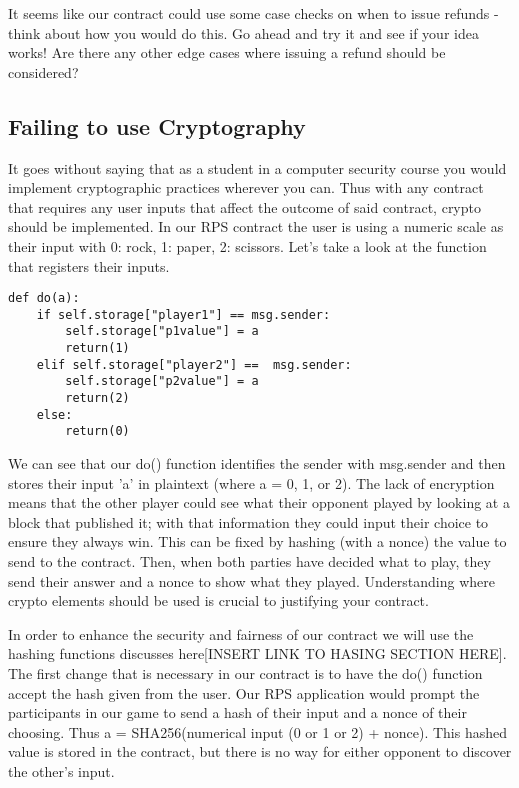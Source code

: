 \documentclass[12pt]{article}
\begin{document}
It seems like our contract could use some case checks on when to issue refunds - think about how you would do this. Go ahead and try it and see if your idea works! Are there any other edge cases where issuing a refund should be considered? 

\subsection{Failing to use Cryptography}
It goes without saying that as a student in a computer security course you would implement cryptographic practices wherever you can. Thus with any contract that requires any user inputs that affect the outcome of said contract, crypto should be implemented. In our RPS contract the user is using a numeric scale as their input with 0: rock, 1: paper, 2: scissors. Let's take a look at the function that registers their inputs.

\begin{lstlisting}[frame=single]
def do(a):
	if self.storage["player1"] == msg.sender:
		self.storage["p1value"] = a
		return(1)
	elif self.storage["player2"] ==  msg.sender:
		self.storage["p2value"] = a
		return(2)
	else:
		return(0)
\end{lstlisting}

We can see that our do() function identifies the sender with msg.sender and then stores their input 'a' in plaintext (where a = 0, 1, or 2). The lack of encryption means that the other player could see what their opponent played by looking at a block that published it; with that information they could input their choice to ensure they always win. This can be fixed by hashing (with a nonce) the value to send to the contract. Then, when both parties have decided what to play, they send their answer and a nonce to show what they played. Understanding where crypto elements should be used is crucial to justifying your contract. 

In order to enhance the security and fairness of our contract we will use the hashing functions discusses here[INSERT LINK TO HASING SECTION HERE]. The first change that is necessary in our contract is to have the do() function accept the hash given from the user. Our RPS application would prompt the participants in our game to send a hash of their input and a nonce of their choosing. Thus a = SHA256(numerical input (0 or 1 or 2) + nonce). This hashed value is stored in the contract, but there is no way for either opponent to discover the other's input.\\
\end{document}
